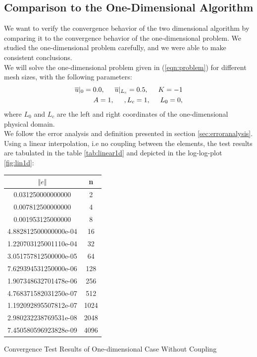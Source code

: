 \documentclass[a4paper,12pt]{article}
\makeatletter
\newenvironment{tablehere}
  {\def\@captype{table}}
  {}
\makeatother
\begin{document}
\subsection{Comparison to the One-Dimensional Algorithm}
We want to verify the convergence behavior of the two dimensional algorithm by comparing it to the convergence behavior of the one-dimensional problem. We studied the one-dimensional problem carefully, and we were able to make consistent conclusions.\\
We will solve the one-dimensional problem given in (\ref{eqn:problem}) for different mesh sizes, with the following parameters:
\begin{eqnarray}
\overline{u}\vert_{0} = 0.0,\hspace{0.5cm} \overline{u}\vert_{L_c} = 0.5, \hspace{0.5cm} K = -1\\
A = 1, \hspace{0.5cm}, L_c = 1,\hspace{0.5cm}L_0 = 0,
\end{eqnarray}
where $L_0$ and $L_c$ are the left and right coordinates of the one-dimensional physical domain.\\
We follow the error analysis and definition presented in section \ref{sec:erroranalysis}.
Using a linear interpolation, i.e no coupling between the elements, the test results are tabulated in the table \ref{tab:linear1d} and depicted in the log-log-plot \ref{fig:lin1d}:
\begin{center}
\begin{tablehere}
\begin{tabular}{cc}
 $\Vert e \Vert$ & n \\
\hline
\hline
0.031250000000000 & 2\\
0.007812500000000 & 4\\
0.001953125000000 & 8\\
4.882812500000000e-04 & 16\\
1.220703125001110e-04 & 32\\
3.051757812500000e-05 & 64\\
7.629394531250000e-06 & 128\\
1.907348632701478e-06 & 256\\
4.768371582031250e-07 & 512\\
1.192092895507812e-07 & 1024\\
2.980232238769531e-08 & 2048\\
7.450580596923828e-09 & 4096\\
\end{tabular}
\caption{Convergence Test Results of One-dimensional Case Without Coupling}\label{tab:linear1d}
\end{tablehere}
\end{center}
\end{document}
